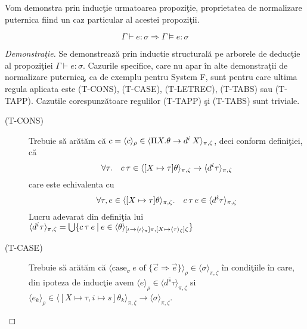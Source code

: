 Vom demonstra prin induc\c tie urmatoarea propozi\c tie, proprietatea de normalizare puternica fiind un caz particular al acestei propozi\c tii.
\begin{proposition}\label{soundness}
$$ \Gamma \vdash e : \sigma \Rightarrow   \Gamma \models e : \sigma$$
\end{proposition}
\begin{proof}[Demonstra\c tie]
Se demonstreaz\u a prin inductie structural\u a pe arborele de deduc\c tie al propozi\c tiei $\Gamma \vdash e : \sigma$. Cazurile specifice, care nu apar \^ in alte demonstra\c tii de normalizare puternic\c a, ca de exemplu pentru System F,  sunt pentru care ultima regula aplicata este {\scriptsize (T-CONS), (T-CASE), (T-LETREC), (T-TABS)} sau {\scriptsize (T-TAPP)}. Cazutile corespunz\u atoare regulilor {\scriptsize (T-TAPP)} \c si {\scriptsize (T-TABS)} sunt triviale.
\begin{description}
  \item[{\scriptsize (T-CONS)}] Trebuie s\u a ar\u at\u am c\u a $c = \langle c \rangle_{\rho} \in \langle \Pi X. \theta \to d^{\hat{\iota}}\hspace{2pt} X \rangle_{\pi,\zeta} $, deci conform defini\c tiei, c\u a
      \begin{equation}
      \forall \tau. \quad c\hspace{2pt} \tau \in \langle [X \mapsto \tau] \theta \rangle_{\pi,\zeta} \to \langle d^{\hat{\iota}} \tau \rangle_{\pi,\zeta}
      \end{equation}
      care este echivalenta cu
      \begin{equation}
      \forall \tau, e \in \langle [X \mapsto \tau] \theta \rangle_{\pi,\zeta} . \quad c\hspace{2pt} \tau\hspace{2pt} e \in \langle d^{\hat{\iota}} \tau \rangle_{\pi,\zeta}
      \end{equation}
      Lucru adevarat din defini\c tia lui $\langle d^{\hat{\iota}} \tau \rangle_{\pi,\zeta} = \bigcup \{ c\hspace{2pt} \tau\hspace{2pt} e \:|\: e \in \langle \theta \rangle_{[\iota \to \langle \iota \rangle_{\pi}]\pi, [ X \mapsto \langle \tau \rangle_{\zeta}]\zeta} \} $

  \item[{\scriptsize (T-CASE)}] Trebuie s\u a ar\u at\u am c\u a $\langle \text{case}_{\sigma}\ e \text{ of } \{ \vec{c} \Rightarrow \vec{e} \} \rangle_{\rho} \in \langle \sigma \rangle_{\pi,\zeta} $ \^ in condi\c tiile \^ in care, din ipoteza de induc\c tie avem $\langle e \rangle_{\rho} \in \langle d^{\hat{s}}\tau \rangle_{\pi,\zeta}$ si $\langle e_k \rangle_{\rho} \in \langle [X\mapsto \tau, i\mapsto s] \theta_k \rangle_{\pi,\zeta} \to \langle \sigma \rangle_{\pi,\zeta}$.


\end{description}
\end{proof}
